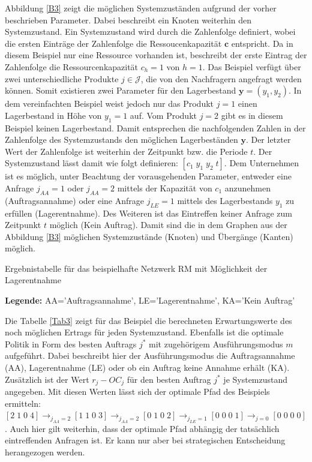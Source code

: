 Abbildung \ref{B3} zeigt die möglichen Systemzuständen aufgrund der vorher beschrieben Parameter. Dabei beschreibt ein Knoten weiterhin den Systemzustand. Ein Systemzustand wird durch die Zahlenfolge definiert, wobei die ersten Einträge der Zahlenfolge die Ressoucenkapazität $\textbf{c}$ entspricht. Da in diesem Beispiel nur eine Ressource vorhanden ist, beschreibt der erste Eintrag der Zahlenfolge die Ressourcenkapazität $c_{h}=1$ von $h=1$. Das Beispiel verfügt über zwei unterschiedliche Produkte $j\in\mathcal{J}$, die von den Nachfragern angefragt werden können. Somit existieren zwei Parameter für den Lagerbestand $\textbf{y}=(y_{1},y_{2})$. In dem vereinfachten Beispiel weist jedoch nur das Produkt $j=1$ einen Lagerbestand in Höhe von $y_{1}=1$ auf. Vom Produkt $j=2$ gibt es in diesem Beispiel keinen Lagerbestand. Damit entsprechen die nachfolgenden Zahlen in der Zahlenfolge des Systemzustands den möglichen Lagerbeständen $\textbf{y}$. Der letzter Wert der Zahlenfolge ist weiterhin der Zeitpunkt bzw. die Periode $t$. Der Systemzustand lässt damit wie folgt definieren: $[c_{1}\; y_{1}\; y_{2}\;t]$. Dem Unternehmen ist es möglich, unter Beachtung der vorausgehenden Parameter, entweder eine Anfrage $j_{AA}=1$ oder $j_{AA}=2$ mittels der Kapazität von $c_{1}$ anzunehmen (Auftragsannahme) oder eine Anfrage $j_{LE}=1$ mittels des Lagerbestands $y_{1}$ zu erfüllen (Lagerentnahme). Des Weiteren ist das Eintreffen keiner Anfrage zum Zeitpunkt $t$ möglich (Kein Auftrag). Damit sind die in dem Graphen aus der Abbildung \ref{B3} möglichen Systemzustände (Knoten) und Übergänge (Kanten) möglich.

\begin{table}
\begin{footnotesize}
    \caption{Ergebnistabelle für das beispielhafte Netzwerk RM mit Möglichkeit der Lagerentnahme} \label{Tab3}
    \vspace*{3mm}
    \begin{center}
      \end{center}
    \begin{center}
      {\footnotesize \textbf{Legende:} AA='Auftragsannahme', LE='Lagerentnahme', KA='Kein Auftrag'} 
      \end{center}
\end{footnotesize}
\end{table}

Die Tabelle \ref{Tab3} zeigt für das Beispiel die berechneten Erwartungswerte des noch möglichen Ertrags für jeden Systemzustand. Ebenfalls ist die optimale Politik in Form des besten Auftrags $j^*$ mit zugehörigem Ausführungsmodus $m$ aufgeführt. Dabei beschreibt hier der Ausführungsmodus die Auftragsannahme (AA), Lagerentnahme (LE) oder ob ein Auftrag keine Annahme erhält (KA). Zusätzlich ist der Wert $r_{j}-OC_{j}$ für den besten Auftrag $j^*$ je Systemzustand angegeben. Mit diesen Werten lässt sich der optimale Pfad des Beispiels ermitteln: $[2\;1\;0\;4] \rightarrow_{j_{AA}=2} [1\;1\;0\;3] \rightarrow_{j_{AA}=2} [0\;1\;0\;2] \rightarrow_{j_{LE}=1} [0\;0\;0\;1]\rightarrow_{j=0} [0\;0\;0\;0]$. Auch hier gilt weiterhin, dass der optimale Pfad abhängig der tatsächlich eintreffenden Anfragen ist. Er kann nur aber bei strategischen Entscheidung herangezogen werden.

